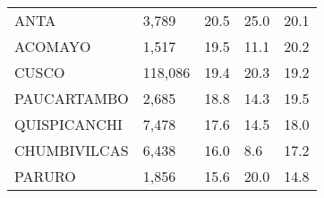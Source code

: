 \begin{tabular}{lllll}
\cellcolor[HTML]{FF5050}ANTA                                   & 3,789                                                                 & 20.5                                                                             & 25.0                                                                        & 20.1                                                                                \\
\cellcolor[HTML]{FF5050}ACOMAYO                                & 1,517                                                                 & 19.5                                                                             & 11.1                                                                        & 20.2                                                                                \\
\cellcolor[HTML]{FF5050}CUSCO                                  & 118,086                                                               & 19.4                                                                             & 20.3                                                                        & 19.2                                                                                \\
\cellcolor[HTML]{FF5050}PAUCARTAMBO                            & 2,685                                                                 & 18.8                                                                             & 14.3                                                                        & 19.5                                                                                \\
\cellcolor[HTML]{FF5050}QUISPICANCHI                           & 7,478                                                                 & 17.6                                                                             & 14.5                                                                        & 18.0                                                                                \\
\cellcolor[HTML]{FF5050}CHUMBIVILCAS                           & 6,438                                                                 & 16.0                                                                             & 8.6                                                                         & 17.2                                                                                \\
\cellcolor[HTML]{FF5050}PARURO                                 & 1,856                                                                 & 15.6                                                                             & 20.0                                                                        & 14.8                                                                                \\

\end{tabular}
